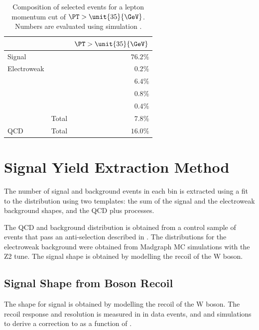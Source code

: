 \begin{table}[htbp]
\begin{center}
\begin{tabular}{llr}
    \toprule
& & $\PT>\unit{35}{\GeV}$\\
\midrule
Signal & \HepProcess{\PW\to\Pe\Pnu} & $76.2\%$ \\
Electroweak & \HepProcess{\PZ\to\Ptau\Ptau} & $0.2\%$  \\
    & \HepProcess{\PZ\to\Pe\Pe}     & $6.4\%$  \\
    & \HepProcess{\PW\to\Ptau\Pnu}  & $0.8\%$  \\
    & \HepProcess{\Ptop\APtop}      & $0.4\%$  \\
    & Total                         & $7.8\%$  \\
QCD & Total                         & $16.0\%$ \\
\bottomrule
\end{tabular}
\caption[Composition of selected events for a lepton momentum cut of
{$\PT>\unit{35}{\GeV}$}.] {Composition of selected events for a lepton momentum
cut of $\PT>\unit{35}{\GeV}$. Numbers are evaluated using simulation
\cite{bendavid2011electron}.}
\label{tab:updatedselectedcomp}
\end{center}
\end{table}

\section{Signal Yield Extraction Method}
The number of signal and background events in each bin is extracted using a fit
to the \ETm distribution using two templates: the sum of the \Wenu signal and
the {electroweak} background shapes, and the {QCD} plus \gjet processes.

The {QCD} and \gjet background distribution is obtained from a control sample of
events that pass an anti-selection described in .  The
\ETm distributions for the {electroweak} background were obtained from Madgraph
{MC} simulations with the Z2 tune.  The signal \ETm shape is
obtained by modelling the recoil of the W boson. 

\subsection{Signal \ETm Shape from Boson Recoil}
The \ETm shape for signal is obtained by modelling the recoil of the W boson.  The
recoil response and resolution is measured in in \HepProcess{\PZ\to\Pe\Pe} data
events, and \PW and  simulations to derive a correction to \ETm as a
function of \PW \pT \cite{bauer2010modeling,alcaraz2010updated}.

